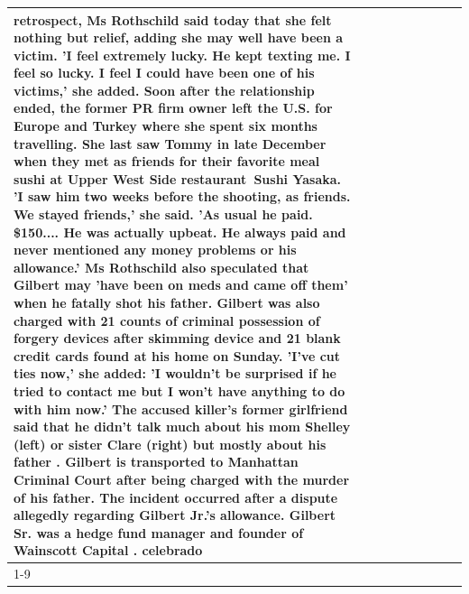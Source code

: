 \begin{table}[H]
\begin{tabular}{lllrlllll}
retrospect, Ms Rothschild said today that she felt nothing but relief, adding she may well have been a victim. 'I feel extremely lucky. He kept texting me. I feel so lucky. I feel I could have been one of his victims,' she added. Soon after the relationship ended, the former PR firm owner left the U.S. for Europe and Turkey where she spent six months  travelling. She last saw Tommy in late December when they met as friends for their favorite meal sushi at Upper West Side restaurant Sushi Yasaka. 'I saw him two weeks before the shooting, as friends. We stayed friends,' she said. 'As usual he paid. \$150.... He was actually upbeat. He always paid and never mentioned any money problems or his allowance.' Ms Rothschild also speculated that Gilbert may 'have been on meds and came off them' when he fatally shot his father. Gilbert was also charged with 21 counts of criminal possession of forgery devices after skimming device and 21 blank credit cards found at his home on Sunday. 'I've cut ties now,' she added: 'I wouldn’t be surprised if he tried to contact me but I won’t have anything to do with him now.' The accused killer's former girlfriend said that he didn't talk much about his mom Shelley (left) or sister Clare (right) but mostly about his father . Gilbert is transported to Manhattan Criminal Court  after being charged with the murder of his father. The incident occurred after a dispute allegedly regarding Gilbert Jr.'s allowance. Gilbert Sr. was a hedge fund manager and founder of Wainscott Capital . celebrado \\
\cline{1-9}

\end{tabular}
\end{table}
